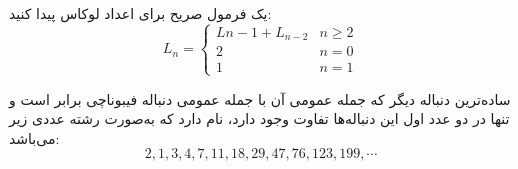	\p
	یک فرمول صریح برای اعداد لوکاس پیدا کنید:
	\begin{equation}
  L_n =
    \begin{cases}
      L{n-1} + L_{n-2} & n \geq 2\\
      2 & n = 0\\
      1 & n = 1
    \end{cases}       
\end{equation}

\begin{DEFINITION}
	\p
{}
ساده‌ترین دنباله دیگر که جمله عمومی آن با جمله عمومی دنباله فیبوناچی برابر است و تنها در دو عدد اول این دنباله‌ها تفاوت وجود دارد،
نام دارد که به‌صورت رشته عددی زیر می‌باشد:
$$2, 1, 3, 4, 7, 11, 18, 29, 47, 76, 123, 199, \cdots$$
\end{DEFINITION}